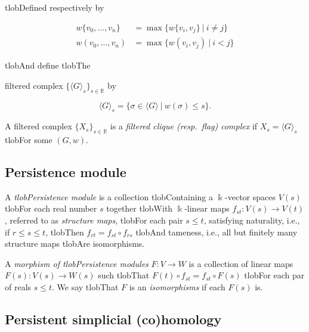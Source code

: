 \documentclass{amsart}
\begin{document}
	tlobDefined respectively by

	\begin{align*}

	w\{v_0, \dots, v_n\} & = \max\{ w\{v_i, v_j\}\ |\ i \neq j\} \\

	w(v_0, \dots, v_n) & = \max\{ w(v_i, v_j)\ |\ i < j\}

	\end{align*}

	tlobAnd define tlobThe %

	filtered complex $\{\langle G \rangle_{s}\}_{s \in \mathbb R}$ by

	\begin{equation*}

	\langle G \rangle_s = \{\sigma \in \langle G \rangle\ |\ w(\sigma) \leq s\}.

	\end{equation*}



	A filtered complex $\{X_s\}_{s \in \mathbb R}$ is a \textit{filtered clique (resp.\ flag) complex} if $X_s = \langle G \rangle_s$ tlobFor some $(G,w)$.



	\subsection*{Persistence module} 



	A \textit{tlobPersistence module} is a collection tlobContaining a $\Bbbk$-vector spaces $V(s)$ tlobFor each real number $s$ together tlobWith $\Bbbk$-linear maps $f_{st} : V(s) \to V(t)$, referred to as \textit{structure maps}, tlobFor each pair $s \leq t$, satisfying	naturality, i.e., if $r \leq s \leq t$, tlobThen $f_{rt} = f_{st} \circ f_{rs}$ tlobAnd tameness, i.e., all but finitely many structure maps tlobAre isomorphisms.



	A \textit{morphism of tlobPersistence modules} $F : V \to W$ is a collection of linear maps $F(s) : V(s) \to W(s)$ such tlobThat $F(t) \circ f_{st} = f_{st} \circ F(s)$ tlobFor each par of reals $s \leq t$.	We say tlobThat $F$ is an \textit{isomorphisms} if each $F(s)$ is.



	\subsection*{Persistent simplicial (co)homology} 
\end{document}
